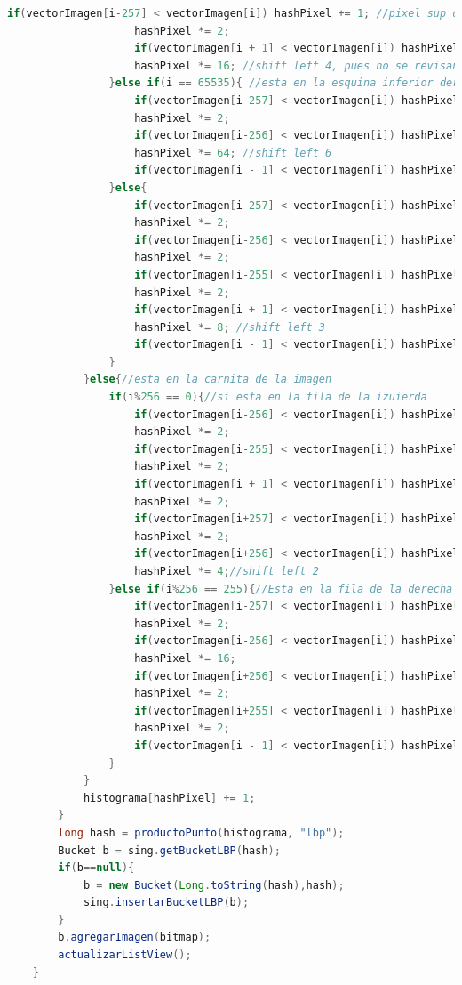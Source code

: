 \documentclass[12pt,twocolumn,letterpaper]{article}
\begin{document}
\begin{lstlisting}[language=Java]
                    if(vectorImagen[i-257] < vectorImagen[i]) hashPixel += 1; //pixel sup derecha
                    hashPixel *= 2;
                    if(vectorImagen[i + 1] < vectorImagen[i]) hashPixel += 1; //pixel de derecha
                    hashPixel *= 16; //shift left 4, pues no se revisan los ultimos
                }else if(i == 65535){ //esta en la esquina inferior derecha
                    if(vectorImagen[i-257] < vectorImagen[i]) hashPixel += 1; //pixel superior izquierda
                    hashPixel *= 2;
                    if(vectorImagen[i-256] < vectorImagen[i]) hashPixel += 1; //pixel arriba
                    hashPixel *= 64; //shift left 6
                    if(vectorImagen[i - 1] < vectorImagen[i]) hashPixel += 1;//pixel izquierda
                }else{
                    if(vectorImagen[i-257] < vectorImagen[i]) hashPixel += 1;
                    hashPixel *= 2;
                    if(vectorImagen[i-256] < vectorImagen[i]) hashPixel += 1;
                    hashPixel *= 2;
                    if(vectorImagen[i-255] < vectorImagen[i]) hashPixel += 1;
                    hashPixel *= 2;
                    if(vectorImagen[i + 1] < vectorImagen[i]) hashPixel += 1;
                    hashPixel *= 8; //shift left 3
                    if(vectorImagen[i - 1] < vectorImagen[i]) hashPixel += 1;
                }
            }else{//esta en la carnita de la imagen
                if(i%256 == 0){//si esta en la fila de la izuierda
                    if(vectorImagen[i-256] < vectorImagen[i]) hashPixel += 1; //pixel arriba
                    hashPixel *= 2;
                    if(vectorImagen[i-255] < vectorImagen[i]) hashPixel += 1; // esquina superior derecha
                    hashPixel *= 2;
                    if(vectorImagen[i + 1] < vectorImagen[i]) hashPixel += 1; //pixel derecha
                    hashPixel *= 2;
                    if(vectorImagen[i+257] < vectorImagen[i]) hashPixel += 1; // esquina inf derecha
                    hashPixel *= 2;
                    if(vectorImagen[i+256] < vectorImagen[i]) hashPixel += 1; // esquina superior derecha
                    hashPixel *= 4;//shift left 2
                }else if(i%256 == 255){//Esta en la fila de la derecha
                    if(vectorImagen[i-257] < vectorImagen[i]) hashPixel += 1; //pixel superior izq
                    hashPixel *= 2;
                    if(vectorImagen[i-256] < vectorImagen[i]) hashPixel += 1; //pixel arriba
                    hashPixel *= 16;
                    if(vectorImagen[i+256] < vectorImagen[i]) hashPixel += 1; // pixel abajo
                    hashPixel *= 2;
                    if(vectorImagen[i+255] < vectorImagen[i]) hashPixel += 1; // pixel inf izq
                    hashPixel *= 2;
                    if(vectorImagen[i - 1] < vectorImagen[i]) hashPixel += 1; // pixel izquierda
                }
            }
            histograma[hashPixel] += 1;
        }
        long hash = productoPunto(histograma, "lbp");
        Bucket b = sing.getBucketLBP(hash);
        if(b==null){
            b = new Bucket(Long.toString(hash),hash);
            sing.insertarBucketLBP(b);
        }
        b.agregarImagen(bitmap);
        actualizarListView();
    }



\end{lstlisting}
\end{document}
